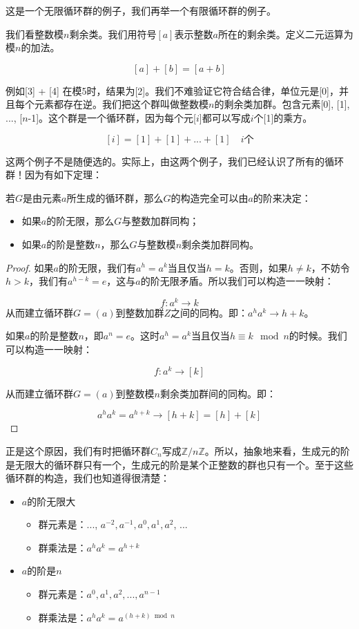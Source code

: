 \documentclass[b5paper]{ctexart}
\begin{document}
这是一个无限循环群的例子，我们再举一个有限循环群的例子。

\begin{example}
我们看整数模$n$剩余类。我们用符号$[a]$表示整数$a$所在的剩余类。定义二元运算为模$n$的加法。

\[
[a] + [b] = [a + b]
\]

例如[3] + [4] 在模5时，结果为[2]。我们不难验证它符合结合律，单位元是[0]，并且每个元素都存在逆。我们把这个群叫做整数模$n$的剩余类加群。包含元素[0], [1], ..., [$n$-1]。这个群是一个循环群，因为每个元[$i$]都可以写成$i$个[1]的乘方。

\[
[i] = [1] + [1] + ... + [1] \quad \text{$i$个}
\]
\end{example}

这两个例子不是随便选的。实际上，由这两个例子，我们已经认识了所有的循环群！因为有如下定理：

\begin{theorem}
若$G$是由元素$a$所生成的循环群，那么$G$的构造完全可以由$a$的阶来决定：
\begin{itemize}
\item 如果$a$的阶无限，那么$G$与整数加群同构；
\item 如果$a$的阶是整数$n$，那么$G$与整数模$n$剩余类加群同构。
\end{itemize}
\end{theorem}

\begin{proof}
如果$a$的阶无限，我们有$a^h = a^k$当且仅当$h = k$。否则，如果$h \neq k$，不妨令$h > k$，我们有$a^{h - k} = e$，这与$a$的阶无限矛盾。所以我们可以构造一一映射：

\[
f: a^k \to k
\]
从而建立循环群$G=(a)$到整数加群$Z$之间的同构。即：$a^ha^k \to h + k$。

如果$a$的阶是整数$n$，即$a^n = e$。这时$a^h = a^k$当且仅当$h \equiv k \mod n$的时候。我们可以构造一一映射：

\[
f: a^k \to [k]
\]

从而建立循环群$G = (a)$到整数模$n$剩余类加群间的同构。即：

\[
a^ha^k = a^{h + k} \to [h + k] = [h] + [k]
\]
\end{proof}

正是这个原因，我们有时把循环群$C_n$写成$\mathbb{Z}/n\mathbb{Z}$。所以，抽象地来看，生成元的阶是无限大的循环群只有一个，生成元的阶是某个正整数的群也只有一个。至于这些循环群的构造，我们也知道得很清楚：

\begin{itemize}
\item $a$的阶无限大
  \begin{itemize}
  \item 群元素是：..., $a^{-2}, a^{-1}, a^0, a^1, a^2$, ...
  \item 群乘法是：$a^ha^k = a^{h + k}$
  \end{itemize}
\item $a$的阶是$n$
  \begin{itemize}
  \item 群元素是：$a^0, a^1, a^2, ..., a^{n-1}$
  \item 群乘法是：$a^ha^k = a^{(h + k) \bmod n}$
  \end{itemize}
\end{itemize}
\end{document}

